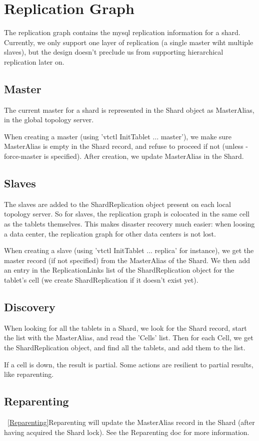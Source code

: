 \section{Replication Graph}\label{Replication-Graph}

The replication graph contains the mysql replication information for a shard. Currently, we only support one layer
of replication (a single master wiht multiple slaves), but the design doesn't preclude us from supporting
hierarchical replication later on.

\subsection{Master}\label{master}

The current master for a shard is represented in the Shard object as MasterAlias, in the global topology server.

When creating a master (using 'vtctl InitTablet ... master'), we make sure MasterAlias is empty in the Shard record, and refuse to proceed if not (unless -force-master is specified). After creation, we update MasterAlias in the Shard.

\subsection{Slaves}\label{slaves}

The slaves are added to the ShardReplication object present on each local topology server. So for slaves, the
replication graph is colocated in the same cell as the tablets themselves. This makes disaster recovery much easier:
when loosing a data center, the replication graph for other data centers is not lost.

When creating a slave (using 'vtctl InitTablet ... replica' for instance), we get the master record (if not specified) from the MasterAlias of the Shard. We then add an entry in the ReplicationLinks list of the ShardReplication object for the tablet’s cell (we create ShardReplication if it doesn’t exist yet).

\subsection{Discovery}\label{discovery}

When looking for all the tablets in a Shard, we look for the Shard record, start the list with the MasterAlias, and read the 'Cells' list. Then for each Cell, we get the ShardReplication object, and find all the tablets, and add them to the list.

If a cell is down, the result is partial. Some actions are resilient to partial results, like reparenting.
\subsection{Reparenting}

~\ref{Reparenting}{Reparenting} will update the MasterAlias record in the Shard (after having acquired the Shard lock). See the Reparenting doc for more information.

